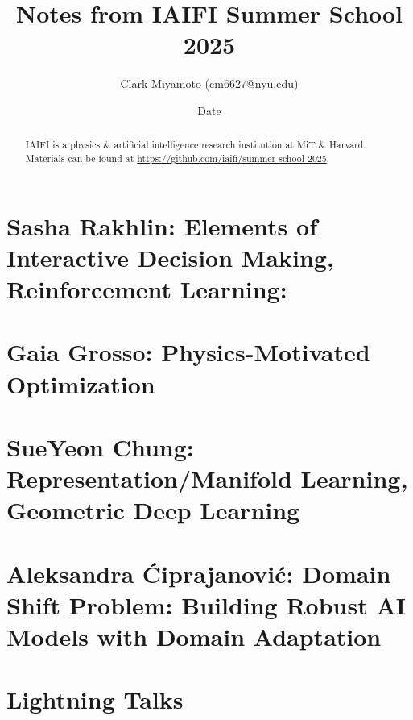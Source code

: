 \documentclass[12pt,fleqn]{article}
\title{Notes from IAIFI Summer School 2025}
\author{Clark Miyamoto (cm6627@nyu.edu)}
\date{Date}
\numberwithin{equation}{section} %
\begin{document}
\maketitle
\begin{abstract}
	IAIFI is a physics \& artificial intelligence research institution at MiT \& Harvard. Materials can be found at \url{https://github.com/iaifi/summer-school-2025}.
\end{abstract}
\tableofcontents



\newpage
\part{Sasha Rakhlin: Elements of Interactive Decision Making, Reinforcement Learning:}


\newpage
\part{Gaia Grosso: Physics-Motivated Optimization}


\newpage
\part{SueYeon Chung: Representation/Manifold Learning, Geometric Deep Learning}


\newpage
\part{Aleksandra \'Ciprajanovi\'c: Domain Shift Problem: Building Robust AI Models with Domain Adaptation}

\newpage
\part{Lightning Talks}

\end{document}

